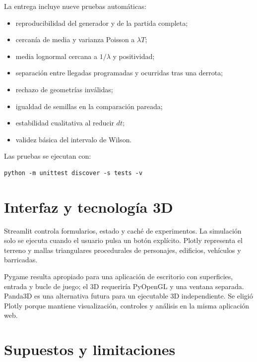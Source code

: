 \documentclass[12pt,a4paper]{article}
\begin{document}
La entrega incluye nueve pruebas autom\'aticas:

\begin{itemize}
  \item reproducibilidad del generador y de la partida completa;
  \item cercan\'ia de media y varianza Poisson a $\lambda T$;
  \item media lognormal cercana a $1/\lambda$ y positividad;
  \item separaci\'on entre llegadas programadas y ocurridas tras una derrota;
  \item rechazo de geometr\'ias inv\'alidas;
  \item igualdad de semillas en la comparaci\'on pareada;
  \item estabilidad cualitativa al reducir $dt$;
  \item validez b\'asica del intervalo de Wilson.
\end{itemize}

Las pruebas se ejecutan con:

\begin{verbatim}
python -m unittest discover -s tests -v
\end{verbatim}

\section{Interfaz y tecnolog\'ia 3D}

Streamlit controla formularios, estado y cach\'e de experimentos. La simulaci\'on
solo se ejecuta cuando el usuario pulsa un bot\'on expl\'icito. Plotly representa
el terreno y mallas triangulares procedurales de personajes, edificios,
veh\'iculos y barricadas.

Pygame resulta apropiado para una aplicaci\'on de escritorio con superficies,
entrada y bucle de juego; el 3D requerir\'ia PyOpenGL y una ventana separada.
Panda3D es una alternativa futura para un ejecutable 3D independiente. Se eligi\'o
Plotly porque mantiene visualizaci\'on, controles y an\'alisis en la misma
aplicaci\'on web.

\section{Supuestos y limitaciones}
\end{document}
